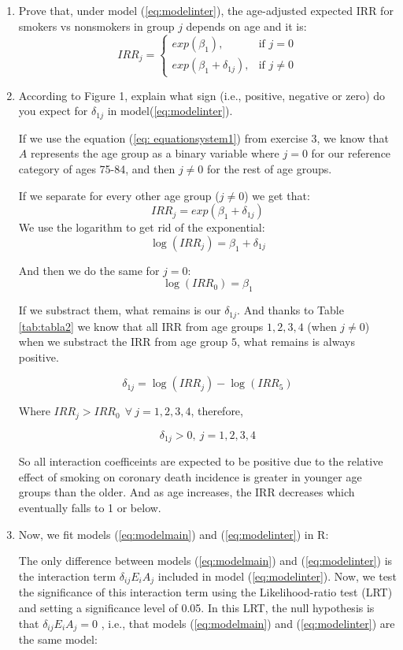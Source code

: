 \documentclass[10pt,a4paper,twoside]{article}\usepackage[]{graphicx}\usepackage[]{xcolor}
\begin{document}
\begin{enumerate}
\item Prove that, under model (\ref{eq:modelinter}), the age-adjusted expected IRR for smokers vs nonsmokers in group $j$ depends on age and it is:
\begin{equation}
\label{eq: equationsystem1}
IRR_{j} =
\begin{cases}
exp\left(\beta_{1}\right), & \text{if $j = 0$} \\
exp\left(\beta_{1} + \delta_{1j}\right), & \text{if $j \neq 0$}
\end{cases}
\end{equation}


\item  According to Figure 1, explain what sign (i.e., positive, negative or zero) do you expect for $\delta_{1j}$ in model(\ref{eq:modelinter}).

If we use the equation (\ref{eq: equationsystem1}) from exercise 3, we know that $A$ represents the age group as a binary variable where $j = 0$ for our reference category of ages 75-84, and then $j \neq 0$ for the rest of age groups. 

If we separate for every other age group ($j \neq 0$) we get that: 
\[
IRR_{j} = exp(\beta_1 + \delta_{1j})
\]
We use the logarithm to get rid of the exponential:
\[
\log(IRR_{j}) = \beta_1 + \delta_{1j}
\]

And then we do the same for $j = 0$:
\[
\log(IRR_{0}) = \beta_1
\]

If we substract them, what remains is our $\delta_{1j}$. And thanks to Table \ref{tab:tabla2} we know that all IRR from age groups $1, 2, 3, 4$ (when $j \neq 0$) when we substract the IRR from age group $5$, what remains is always positive.

\[
\delta_{1j}=\log(IRR_j)-\log(IRR_5)
\]

Where $IRR_{j} > IRR_{0} \ \ \forall \ j = 1, 2, 3, 4$, therefore,

\[
\delta_{1j} > 0, \ j= 1, 2, 3, 4
\]

So all interaction coefficeints are expected to be positive due to the relative effect of smoking on coronary death incidence is greater in younger age groups than the older. And as age increases, the IRR decreases which eventually falls to 1 or below.

\item Now, we fit models (\ref{eq:modelmain}) and (\ref{eq:modelinter}) in R:

The only difference between models (\ref{eq:modelmain}) and (\ref{eq:modelinter}) is the interaction term $\delta_{ij}E_{i}A_{j}$
included in model (\ref{eq:modelinter}). Now, we test the significance of this interaction term using
the Likelihood-ratio test (LRT) and setting a significance level of 0.05. In this LRT,
the null hypothesis is that $\delta_{ij}E_{i}A_{j} = 0$ , i.e., that models (\ref{eq:modelmain}) and (\ref{eq:modelinter}) are the same model:


\end{enumerate}
\end{document}
